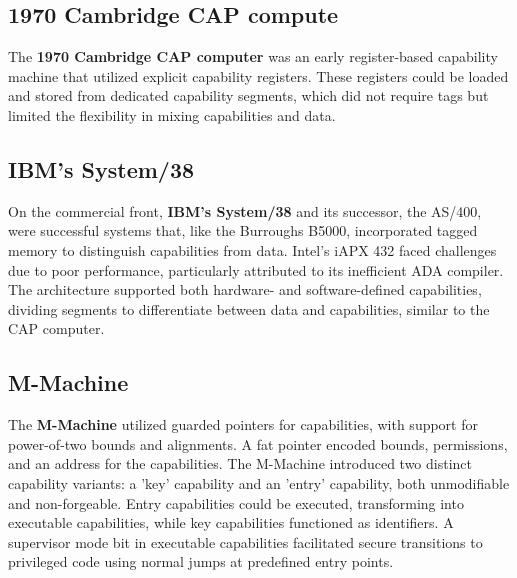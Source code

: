 
\subsection{1970 Cambridge CAP compute}
The \textbf{1970 Cambridge CAP computer}\cite{wilkes_cambridge_1979} was an early register-based capability machine that utilized explicit 
capability registers. These registers could be loaded and stored from dedicated capability 
segments, which did not require tags but limited the flexibility in mixing capabilities and data.
\newline

\subsection{IBM's System/38}
On the commercial front, \textbf{IBM's System/38} and its successor, the AS/400, were successful 
systems that, like the Burroughs B5000, incorporated tagged memory to distinguish 
capabilities from data. Intel's iAPX 432 faced challenges due to poor performance, 
particularly attributed to its inefficient ADA compiler. The architecture supported 
both hardware- and software-defined capabilities, dividing segments to differentiate 
between data and capabilities, similar to the CAP computer.
\newline

\subsection{M-Machine}
The \textbf{M-Machine}\cite{fillo_mmachine_nodate} utilized guarded pointers for capabilities, with support for 
power-of-two bounds and alignments. A fat pointer encoded bounds, permissions, 
and an address for the capabilities. The M-Machine introduced two distinct 
capability variants: a 'key' capability and an 'entry' capability, both 
unmodifiable and non-forgeable. Entry capabilities could be executed, 
transforming into executable capabilities, while key capabilities 
functioned as identifiers. A supervisor mode bit in executable capabilities 
facilitated secure transitions to privileged code using normal jumps at predefined entry points.
\newline

